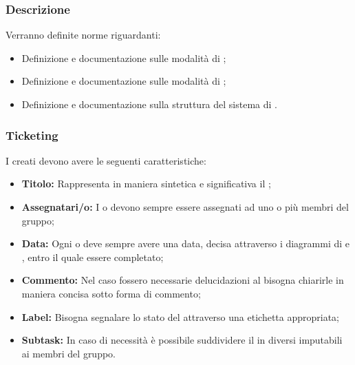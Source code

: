 \documentclass[12pt,a4paper]{article}
\begin{document}
\subsubsection{Descrizione} 
Verranno definite norme riguardanti:
\begin{itemize}
  \item Definizione e documentazione sulle modalità di \textit{} ;
  \item Definizione e documentazione sulle modalità di \textit{};
  \item Definizione e documentazione sulla struttura del sistema di \textit{}.
\end{itemize}

\subsubsection{Ticketing} 
I \textit{} creati devono avere le seguenti caratteristiche:
\begin{itemize}
  \item \textbf{Titolo:} Rappresenta in maniera sintetica e significativa il \textit{};
  \item \textbf{Assegnatari/o:} I \textit{} o \textit{} devono sempre essere assegnati ad uno o più membri del gruppo;
  \item \textbf{Data:} Ogni \textit{} o \textit{} deve sempre avere una data, decisa attraverso i diagrammi di \textit{} e \textit{}, entro il quale essere completato;
  \item \textbf{Commento:} Nel caso fossero necessarie delucidazioni al \textit{} bisogna chiarirle in maniera concisa sotto forma di commento;
  \item \textbf{Label:} Bisogna segnalare lo stato del \textit{} attraverso una etichetta appropriata;
  \item \textbf{Subtask:} In caso di necessità è possibile suddividere il \textit{} in diversi \textit{} imputabili ai membri del gruppo.
\end{itemize}
\end{document}
